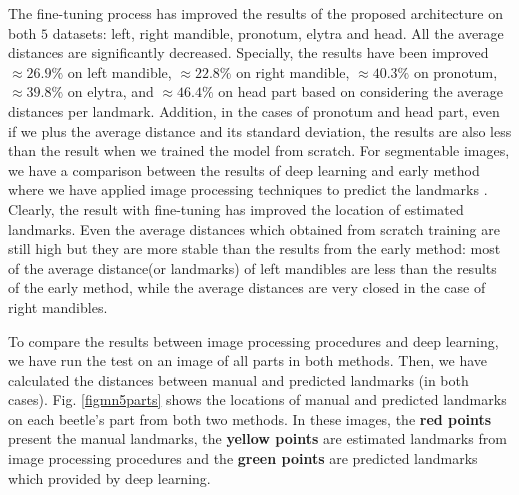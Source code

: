 \documentclass[review]{elsarticle}
\begin{document}
The fine-tuning process has improved the results of the proposed architecture on both $5$ datasets: left, right mandible, pronotum, elytra and head. All the average distances are significantly decreased. Specially, the results have been improved $\approx 26.9\%$ on left mandible, $\approx 22.8\%$ on right mandible, $\approx 40.3\%$ on pronotum, $\approx 39.8\%$ on elytra, and $\approx 46.4\%$  on head part based on considering the average distances per landmark. Addition, in the cases of pronotum and head part, even if we plus the average distance and its standard deviation, the results are also less than the result when we trained the model from scratch. For segmentable images, we have a comparison between the results of deep learning and early method where we have applied image processing techniques to predict the landmarks \cite{le2017maelab}. Clearly, the result with fine-tuning has improved the location of estimated landmarks. Even the average distances which obtained from scratch training are still high but they are more stable than the results from the early method: most of the average distance(or landmarks) of left mandibles are less than the results of the early method, while the average distances are very closed in the case of right mandibles.

To compare the results between image processing procedures and deep learning, we have run the test on an image of all parts in both methods. Then, we have calculated the distances between manual and predicted landmarks (in both cases). Fig. \ref{figmn5parts} shows the locations of manual and predicted landmarks on each beetle's part from both two methods. In these images, the \textbf{red points} present the manual landmarks, the \textbf{yellow points} are estimated landmarks from image processing procedures and the \textbf{green points} are predicted landmarks which provided by deep learning.
\end{document}
